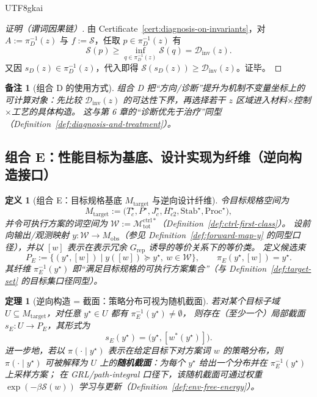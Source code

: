 \documentclass[12pt]{article}
\newtheorem{definition}{定义}[section]
\newtheorem{theorem}{定理}[section]
\newtheorem{remark}{备注}[section]
\begin{document}
\begin{CJK*}{UTF8}{gkai}
\begin{proof}[证明（谓词因果链）]
由 Certificate~\ref{cert:diagnosis-on-invariants}，对 $A:=\pi_D^{-1}(z)$ 与 $f:=\mathcal{S}$，任取 $p\in \pi_D^{-1}(z)$ 有
\[
\mathcal{S}(p)\ge \inf_{q\in \pi_D^{-1}(z)}\mathcal{S}(q)=\mathcal{D}_{\mathrm{inv}}(z).
\]
又因 $s_D(z)\in \pi_D^{-1}(z)$，代入即得 $\mathcal{S}(s_D(z))\ge \mathcal{D}_{\mathrm{inv}}(z)$。证毕。
\end{proof}

\begin{remark}[组合 D 的使用方式]
组合 D 把“方向/诊断”提升为机制不变量坐标上的可计算对象：先比较 $\mathcal{D}_{\mathrm{inv}}(z)$ 的可达性下界，再选择若干 $z$ 区域进入材料$\times$控制$\times$工艺的具体构造。
这与第 6 章的“诊断优先于治疗”同型（Definition~\ref{def:diagnosis-and-treatment}）。
\end{remark}

\subsection{组合 E：性能目标为基底、设计实现为纤维（逆向构造接口）}

\begin{definition}[组合 E：目标规格基底 $M_{\mathrm{target}}$ 与逆向设计纤维]
\label{def:rtsc-bundle-E}
令目标规格空间为
\[
M_{\mathrm{target}}
:=
\bigl(T_c^\star,P^\star,J_c^\star,H_{c2}^\star,\mathrm{Stab}^\star,\mathrm{Proc}^\star\bigr),
\]
并令可执行方案的词空间为 $\mathcal{W}:=\mathcal{M}_{\mathrm{tot}}^{\mathrm{ctrl}\ast}$（Definition~\ref{def:ctrl-first-class}）。
设前向输出/观测映射 $y:\mathcal{W}\to M_{\mathrm{obs}}$（参见 Definition~\ref{def:forward-map-y} 的同型口径），并以 $[w]$ 表示在表示冗余
  $G_{\mathrm{rep}}$ 诱导的等价关系下的等价类。
定义候选束
\[
P_E:=\bigl\{(y^\star,[w])\mid y([w])\succeq y^\star,\ w\in\mathcal{W}\bigr\},
\qquad
\pi_E(y^\star,[w])=y^\star.
\]
其纤维 $\pi_E^{-1}(y^\star)$ 即“满足目标规格的可执行方案集合”（与 Definition~\ref{def:target-set} 的目标集口径同型）。
\end{definition}

\begin{theorem}[逆向构造 = 截面：策略分布可视为随机截面]
\label{thm:inverse-design-as-section}
若对某个目标子域 $U\subseteq M_{\mathrm{target}}$，对任意 $y^\star\in U$ 都有 $\pi_E^{-1}(y^\star)\neq\emptyset$，
则存在（至少一个）局部截面 $s_E:U\to P_E$，其形式为
\[
s_E(y^\star)=\bigl(y^\star,[w^\ast(y^\star)]\bigr).
\]
进一步地，若以 $\pi(\cdot\mid y^\star)$ 表示在给定目标下对方案词 $w$ 的策略分布，则 $\pi(\cdot\mid y^\star)$ 可被解释为 $U$ 上的\textbf{随机截面}：为每个
  $y^\star$ 给出一个分布并在 $\pi_E^{-1}(y^\star)$ 上采样方案；
在 GRL/path-integral 口径下，该随机截面可通过权重 $\exp(-\beta\mathcal{S}(w))$ 学习与更新（Definition~\ref{def:env-free-energy}）。
\end{theorem}


\end{CJK*}
\end{document}

